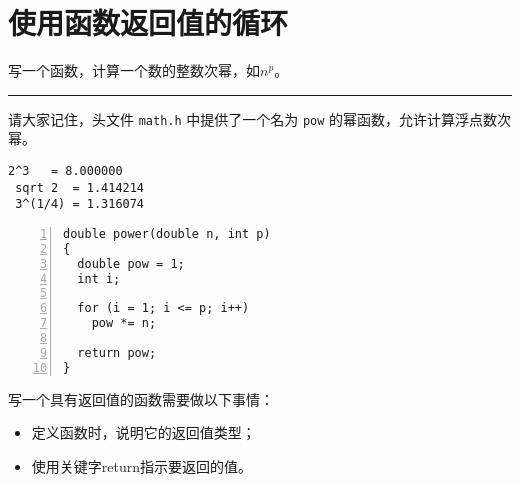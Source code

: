 \section{使用函数返回值的循环}
\begin{frame}[fragile]\ft{\secname}
\begin{biancheng}
  写一个函数，计算一个数的整数次幂，如$n^p$。
\end{biancheng}
\rule{\textwidth}{1mm}\pause \vspace{0.1in}

请大家记住，头文件 \lstinline|math.h| 中提供了一个名为 \lstinline|pow| 的幂函数，允许计算浮点数次幂。


\end{frame}


\begin{frame}[fragile]



\end{frame}


\begin{frame}[fragile]


\begin{lstlisting}[backgroundcolor=\color{red!10}]
   2^3   = 8.000000
 sqrt 2  = 1.414214
 3^(1/4) = 1.316074
\end{lstlisting}

\end{frame}


\begin{frame}[fragile]\ft{\secname}
\begin{lstlisting}[numbers=left]
double power(double n, int p)
{
  double pow = 1;
  int i;
  
  for (i = 1; i <= p; i++)
    pow *= n;
    
  return pow;
}
\end{lstlisting}
\end{frame}


\begin{frame}[fragile]\ft{\secname}
写一个具有返回值的函数需要做以下事情：\vspace{0.1in}

\begin{itemize}
\item 定义函数时，说明它的返回值类型；\\[0.1in]
\item 使用关键字return指示要返回的值。
\end{itemize}
\end{frame}


